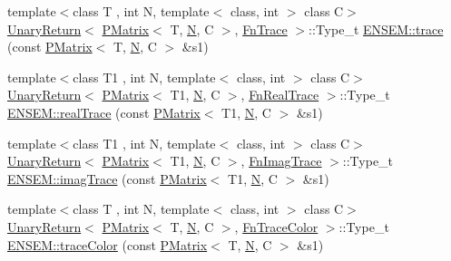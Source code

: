 \begin{DoxyCompactItemize}
\item 
{\footnotesize template$<$class T , int N, template$<$ class, int $>$ class C$>$ }\\\mbox{\hyperlink{structENSEM_1_1UnaryReturn}{Unary\+Return}}$<$ \mbox{\hyperlink{classENSEM_1_1PMatrix}{P\+Matrix}}$<$ T, \mbox{\hyperlink{operator__name__util_8cc_a7722c8ecbb62d99aee7ce68b1752f337}{N}}, C $>$, \mbox{\hyperlink{structENSEM_1_1FnTrace}{Fn\+Trace}} $>$\+::Type\+\_\+t \mbox{\hyperlink{group__primmatrix_gafc761796f6ca23ee43cd937f3459e3ce}{E\+N\+S\+E\+M\+::trace}} (const \mbox{\hyperlink{classENSEM_1_1PMatrix}{P\+Matrix}}$<$ T, \mbox{\hyperlink{operator__name__util_8cc_a7722c8ecbb62d99aee7ce68b1752f337}{N}}, C $>$ \&s1)
\item 
{\footnotesize template$<$class T1 , int N, template$<$ class, int $>$ class C$>$ }\\\mbox{\hyperlink{structENSEM_1_1UnaryReturn}{Unary\+Return}}$<$ \mbox{\hyperlink{classENSEM_1_1PMatrix}{P\+Matrix}}$<$ T1, \mbox{\hyperlink{operator__name__util_8cc_a7722c8ecbb62d99aee7ce68b1752f337}{N}}, C $>$, \mbox{\hyperlink{structENSEM_1_1FnRealTrace}{Fn\+Real\+Trace}} $>$\+::Type\+\_\+t \mbox{\hyperlink{group__primmatrix_gaf2db8b017f816bb958ba639899fa1cf7}{E\+N\+S\+E\+M\+::real\+Trace}} (const \mbox{\hyperlink{classENSEM_1_1PMatrix}{P\+Matrix}}$<$ T1, \mbox{\hyperlink{operator__name__util_8cc_a7722c8ecbb62d99aee7ce68b1752f337}{N}}, C $>$ \&s1)
\item 
{\footnotesize template$<$class T1 , int N, template$<$ class, int $>$ class C$>$ }\\\mbox{\hyperlink{structENSEM_1_1UnaryReturn}{Unary\+Return}}$<$ \mbox{\hyperlink{classENSEM_1_1PMatrix}{P\+Matrix}}$<$ T1, \mbox{\hyperlink{operator__name__util_8cc_a7722c8ecbb62d99aee7ce68b1752f337}{N}}, C $>$, \mbox{\hyperlink{structENSEM_1_1FnImagTrace}{Fn\+Imag\+Trace}} $>$\+::Type\+\_\+t \mbox{\hyperlink{group__primmatrix_gaa17cf25ee54da2665418c0cfbccc0ae9}{E\+N\+S\+E\+M\+::imag\+Trace}} (const \mbox{\hyperlink{classENSEM_1_1PMatrix}{P\+Matrix}}$<$ T1, \mbox{\hyperlink{operator__name__util_8cc_a7722c8ecbb62d99aee7ce68b1752f337}{N}}, C $>$ \&s1)
\item 
{\footnotesize template$<$class T , int N, template$<$ class, int $>$ class C$>$ }\\\mbox{\hyperlink{structENSEM_1_1UnaryReturn}{Unary\+Return}}$<$ \mbox{\hyperlink{classENSEM_1_1PMatrix}{P\+Matrix}}$<$ T, \mbox{\hyperlink{operator__name__util_8cc_a7722c8ecbb62d99aee7ce68b1752f337}{N}}, C $>$, \mbox{\hyperlink{structENSEM_1_1FnTraceColor}{Fn\+Trace\+Color}} $>$\+::Type\+\_\+t \mbox{\hyperlink{group__primmatrix_ga1d05c45afa351dba712d9d083a013d41}{E\+N\+S\+E\+M\+::trace\+Color}} (const \mbox{\hyperlink{classENSEM_1_1PMatrix}{P\+Matrix}}$<$ T, \mbox{\hyperlink{operator__name__util_8cc_a7722c8ecbb62d99aee7ce68b1752f337}{N}}, C $>$ \&s1)

\end{DoxyCompactItemize}
